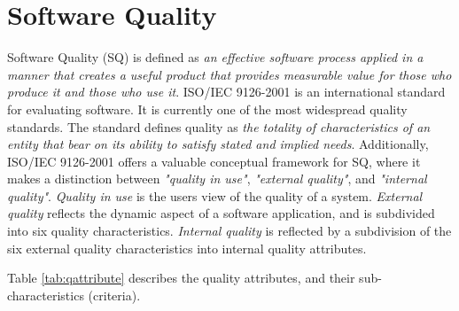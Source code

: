 {\section{Software Quality}
\label{sec:2-SQ}
Software Quality (SQ) is defined as \textit{an effective software process applied in a manner that creates a useful product that provides measurable value for those who produce it and those who use it}\cite{Pressman:2009:SEP:1593949}. ISO/IEC 9126-2001 is an international standard for evaluating software\cite{ISOIEC9126}. It is currently one of the most widespread quality standards\cite{trienekens2010quality}. The standard defines quality as \textit{the totality of characteristics of an entity that bear on its ability to satisfy stated and implied needs}. Additionally, ISO/IEC 9126-2001 offers a valuable conceptual framework for SQ, where it makes a distinction between \textit{"quality in use"}, \textit{"external quality"}, and \textit{"internal quality"}\cite{ISOIEC9126,trienekens2010quality}. \textit{Quality in use} is the users view of the quality of a system. \textit{External quality} reflects the dynamic aspect of a software application, and is subdivided into six quality characteristics. \textit{Internal quality} is reflected by a subdivision of the six external quality characteristics into internal quality attributes.

Table \ref{tab:qattribute} describes the quality attributes, and their sub-characteristics (criteria).

}

